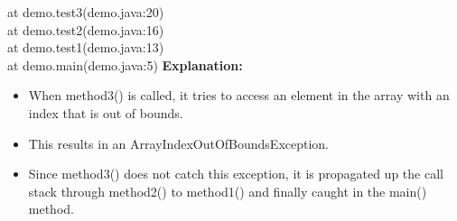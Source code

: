 \begin{flushleft}
\begin{itemize}
{			at demo.test3(demo.java:20) \\
			at demo.test2(demo.java:16) \\
			at demo.test1(demo.java:13) \\
			at demo.main(demo.java:5)
		}
		\bigskip
		\textbf{Explanation:}
		\begin{itemize}
			\item When method3() is called, it tries to access an element in the array with an index that is out of bounds. 
			\item This results in an ArrayIndexOutOfBoundsException. 
			\item Since method3() does not catch this exception, it is propagated up the call stack through method2() to method1() and finally caught in the main() method.
		\end{itemize}
	\end{itemize}
	
\end{flushleft}
\newpage






